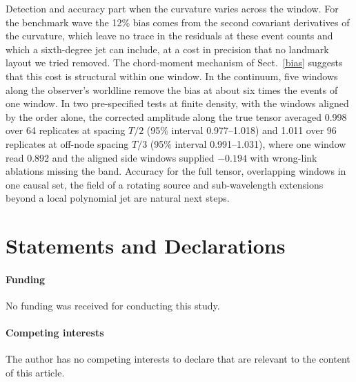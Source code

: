 \documentclass[11pt,a4paper]{article}
\begin{document}
Detection and accuracy part when the curvature varies across the window.
For the benchmark wave the 12\% bias comes from the second covariant
derivatives of the curvature, which leave no trace in the residuals at these
event counts and which a sixth-degree jet can include, at a cost in
precision that no landmark layout we tried removed. The chord-moment
mechanism of Sect.~\ref{bias} suggests that this cost is structural within
one window. In the continuum, five windows along the observer's worldline
remove the bias at about six times the events of one window. In two
pre-specified tests at finite density, with the windows aligned by the order
alone, the corrected amplitude along the true tensor averaged 0.998 over 64
replicates at spacing $T/2$ (95\% interval 0.977--1.018) and 1.011 over
96 replicates at off-node spacing $T/3$ (95\% interval 0.991--1.031),
where one window read 0.892 and the aligned side windows supplied $-0.194$
with wrong-link ablations missing the band. Accuracy for the full tensor,
overlapping windows in one causal set, the field of a rotating source and
sub-wavelength extensions beyond a local polynomial jet are natural next steps.


\section*{Statements and Declarations}
\paragraph{Funding} No funding was received for conducting this study.
\paragraph{Competing interests} The author has no competing interests to
declare that are relevant to the content of this article.
\end{document}
